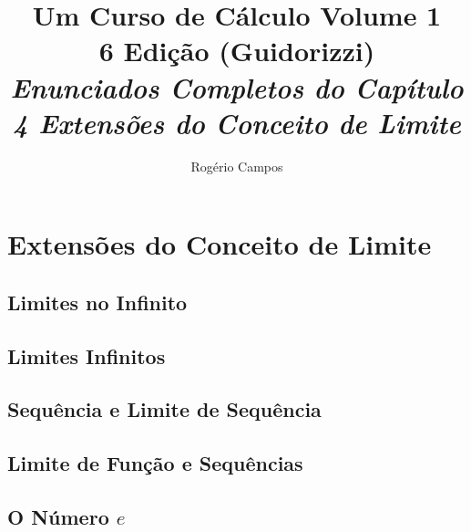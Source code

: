 \documentclass[12pt,a4paper]{article}
\title{
    \Huge \textbf{Um Curso de Cálculo Volume 1} \\
    \vspace{0.3cm}
    \Large 6\textordfeminine{} Edição (Guidorizzi) \\
    \vspace{0.5cm}
    \large \textit{Enunciados Completos do Capítulo 4 Extensões do Conceito de Limite}
}
\author{Rogério Campos}
\begin{document}
\maketitle
\newpage

\tableofcontents
\newpage

\setcounter{section}{3}
\setcounter{subsection}{0}

\section{Extensões do Conceito de Limite}
\subsection{Limites no Infinito}
\subsection{Limites Infinitos}
\subsection{Sequência e Limite de Sequência}
\subsection{Limite de Função e Sequências}
\subsection{O Número $e$}
\end{document}
